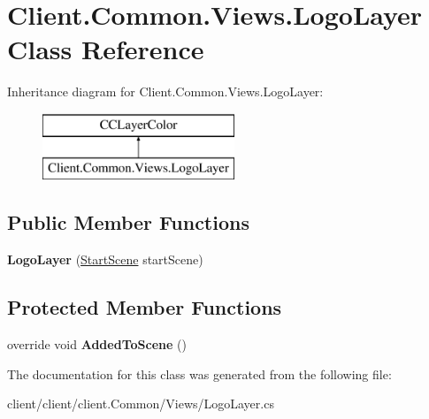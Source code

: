 \hypertarget{classClient_1_1Common_1_1Views_1_1LogoLayer}{\section{Client.\-Common.\-Views.\-Logo\-Layer Class Reference}
\label{classClient_1_1Common_1_1Views_1_1LogoLayer}
}
Inheritance diagram for Client.\-Common.\-Views.\-Logo\-Layer\-:\begin{figure}[H]
\begin{center}
\leavevmode
\includegraphics[height=2.000000cm]{classClient_1_1Common_1_1Views_1_1LogoLayer}
\end{center}
\end{figure}
\subsection*{Public Member Functions}
\begin{DoxyCompactItemize}
\item 
\hypertarget{classClient_1_1Common_1_1Views_1_1LogoLayer_a0a0c2ad0ea01f8f6fd135c5259b54d89}{{\bfseries Logo\-Layer} (\hyperlink{classClient_1_1Common_1_1Views_1_1StartScene}{Start\-Scene} start\-Scene)}\label{classClient_1_1Common_1_1Views_1_1LogoLayer_a0a0c2ad0ea01f8f6fd135c5259b54d89}

\end{DoxyCompactItemize}
\subsection*{Protected Member Functions}
\begin{DoxyCompactItemize}
\item 
\hypertarget{classClient_1_1Common_1_1Views_1_1LogoLayer_ab7adc83ae509b73ddeb815f96fe26f10}{override void {\bfseries Added\-To\-Scene} ()}\label{classClient_1_1Common_1_1Views_1_1LogoLayer_ab7adc83ae509b73ddeb815f96fe26f10}

\end{DoxyCompactItemize}


The documentation for this class was generated from the following file\-:\begin{DoxyCompactItemize}
\item 
client/client/client.\-Common/\-Views/Logo\-Layer.\-cs\end{DoxyCompactItemize}
